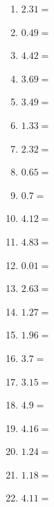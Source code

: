 \documentclass[12pt]{article}
\begin{document}
\begin{enumerate}
\newpage
\item \large $ 2.31 = $ \vspace{1.5cm}
\item \large $ 0.49 = $ \vspace{1.5cm}
\item \large $ 4.42 = $ \vspace{1.5cm}
\item \large $ 3.69 = $ \vspace{1.5cm}
\item \large $ 3.49 = $ \vspace{1.5cm}
\item \large $ 1.33 = $ \vspace{1.5cm}
\item \large $ 2.32 = $ \vspace{1.5cm}
\item \large $ 0.65 = $ \vspace{1.5cm}
\item \large $ 0.7 = $ \vspace{1.5cm}
\item \large $ 4.12 = $ \vspace{1.5cm}
\newpage
\item \large $ 4.83 = $ \vspace{1.5cm}
\item \large $ 0.01 = $ \vspace{1.5cm}
\item \large $ 2.63 = $ \vspace{1.5cm}
\item \large $ 1.27 = $ \vspace{1.5cm}
\item \large $ 1.96 = $ \vspace{1.5cm}
\item \large $ 3.7 = $ \vspace{1.5cm}
\item \large $ 3.15 = $ \vspace{1.5cm}
\item \large $ 4.9 = $ \vspace{1.5cm}
\item \large $ 4.16 = $ \vspace{1.5cm}
\item \large $ 1.24 = $ \vspace{1.5cm}
\newpage
\item \large $ 1.18 = $ \vspace{1.5cm}
\item \large $ 4.11 = $ \vspace{1.5cm}

\end{enumerate}
\end{document}
